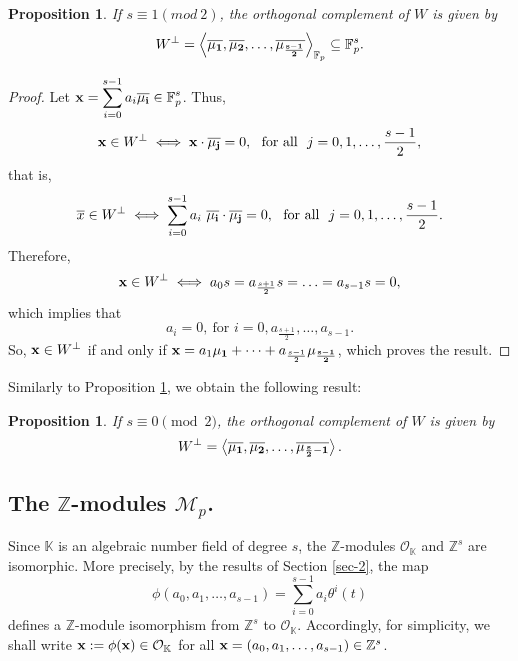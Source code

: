 \documentclass{amsart}
\newtheorem{proposition}[theorem]{Proposition}
\begin{document}
\begin{proposition}\label{prop-2} If $s\equiv 1(mod\ 2)$, the orthogonal complement of $W$ is given by $$W^{\perp} = \left\langle\overline{\bf \mu_1},\overline{\bf \mu_2},\ldots,\overline{\bf \mu_{\frac{s-1}{2}}}\right\rangle_{\mathbb{F}_p} \subseteq\mathbb{F}_p^s.$$ \end{proposition}
\begin{proof} Let ${\bf x} = \displaystyle \sum_{i=0}^{s-1}a_i\overline{\bf \mu_i}\in \mathbb{F}_p^s$. Thus,  
\[ {\bf x}\in W^{\perp} \iff {\bf x}\cdot \overline{\bf \mu_j}=0, \ \ \mbox{for all} \ \ j=0,1,\ldots,\frac{s-1}{2}, \] that is, \[ \overline{x}\in W^{\perp} \iff \sum_{i=0}^{s-1} a_i\ \overline{\bf \mu_i}\cdot \overline{\bf\mu_j}=0, \ \ \mbox{for all} \ \ j=0,1,\ldots,\frac{s-1}{2}. \] Therefore, \[ {\bf x}\in W^{\perp}
\iff a_0s=a_{\frac{s+1}{2}}s = \ldots = a_{s-1}s =0, \] which implies that \[ a_i=0,~\mbox{for } i=0,a_{\frac{s+1}{2}},\ldots,a_{s-1}. \] So, ${\bf x}\in W^\perp$ if and only if ${\bf x}=a_1{\bf\mu_1}+\cdots+a_{\frac{s-1}{2}}{\bf \mu_{\frac{s-1}{2}}}$, which proves the result. \end{proof}

Similarly to Proposition \ref{prop-2}, we obtain the following result:

\begin{proposition}
    \label{cor-0} If $s\equiv 0\pmod 2$, the orthogonal complement of $W$ is given by $$W^{\perp} = \left<\overline{\bf \mu_1},\overline{\bf \mu_2},\ldots,\overline{\bf \mu_{\frac{s}{2}-1}}\right>.$$
\end{proposition} 

\subsection{The $\mathbb{Z}$-modules $\mathcal{M}_p$.}\label{subsection_Mp}

Since $\mathbb{K}$ is an algebraic number field of degree $s$, the $\mathbb{Z}$-modules $\mathcal{O}_\mathbb{K}$ and $\mathbb{Z}^s$ are isomorphic. More precisely, by the results of Section \ref{sec-2}, the map
\begin{equation}\label{eq_iso}
  \phi\left(a_0,a_1,\ldots,a_{s-1}\right)=\sum_{i=0}^{s-1} a_i\theta^i(t)  
\end{equation}
defines a $\mathbb{Z}$-module isomorphism from $\mathbb{Z}^s$ to $\mathcal{O}_\mathbb{K}$. Accordingly, for simplicity, we shall write ${\bf x}:=\phi({\bf x})\in\mathcal{O}_\mathbb{K}$ for all ${\bf x}=(a_0,a_1,\ldots,a_{s-1})\in\mathbb{Z}^s$.
\end{document}
